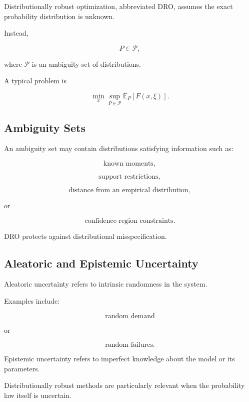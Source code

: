 Distributionally robust optimization, abbreviated DRO, assumes the exact
probability distribution is unknown.

Instead,

\[
\boxed{
P
\in
\mathcal{P},
}
\]

where \(\mathcal{P}\) is an ambiguity set of distributions.

A typical problem is

\[
\boxed{
\min_x
\sup_{P\in\mathcal{P}}
\mathbb{E}_{P}
[
F(x,\xi)
].
}
\]

\subsection{Ambiguity Sets}
\label{subsec:ambiguity-sets}

An ambiguity set may contain distributions satisfying information such as:

\[
\boxed{
\text{known moments},
}
\]

\[
\boxed{
\text{support restrictions},
}
\]

\[
\boxed{
\text{distance from an empirical distribution},
}
\]

or

\[
\boxed{
\text{confidence-region constraints}.
}
\]

DRO protects against distributional misspecification.

\subsection{Aleatoric and Epistemic Uncertainty}
\label{subsec:aleatoric-epistemic-uncertainty}

Aleatoric uncertainty refers to intrinsic randomness in the system.

Examples include:

\[
\boxed{
\text{random demand}
}
\]

or

\[
\boxed{
\text{random failures}.
}
\]

Epistemic uncertainty refers to imperfect knowledge about the model or its
parameters.

Distributionally robust methods are particularly relevant when the
probability law itself is uncertain.

